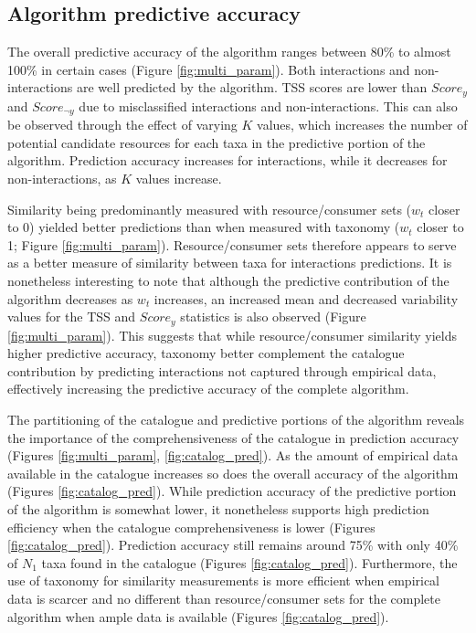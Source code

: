     \subsection{Algorithm predictive accuracy}
The overall predictive accuracy of the algorithm ranges between 80\% to almost 100\% in certain cases (Figure \ref{fig:multi_param}). Both interactions and non-interactions are well predicted by the algorithm. TSS scores are lower than $Score_y$ and $Score_{\neg y}$ due to misclassified interactions and non-interactions. This can also be observed through the effect of varying $K$ values, which increases the number of potential candidate resources for each taxa in the predictive portion of the algorithm. Prediction accuracy increases for interactions, while it decreases for non-interactions, as $K$ values increase.

Similarity being predominantly measured with resource/consumer sets ($w_t$ closer to 0) yielded better predictions than when measured with taxonomy ($w_t$ closer to 1; Figure \ref{fig:multi_param}). Resource/consumer sets therefore appears to serve as a better measure of similarity between taxa for interactions predictions. It is nonetheless interesting to note that although the predictive contribution of the algorithm decreases as $w_t$ increases, an increased mean and decreased variability values for the TSS and $Score_y$ statistics is also observed (Figure \ref{fig:multi_param}). This suggests that while resource/consumer similarity yields higher predictive accuracy, taxonomy better complement the catalogue contribution by predicting interactions not captured through empirical data, effectively increasing the predictive accuracy of the complete algorithm.

The partitioning of the catalogue and predictive portions of the algorithm reveals the importance of the comprehensiveness of the catalogue in prediction accuracy (Figures \ref{fig:multi_param}, \ref{fig:catalog_pred}). As the amount of empirical data available in the catalogue increases so does the overall accuracy of the algorithm (Figures \ref{fig:catalog_pred}). While prediction accuracy of the predictive portion of the algorithm is somewhat lower, it nonetheless supports high prediction efficiency when the catalogue comprehensiveness is lower (Figures \ref{fig:catalog_pred}). Prediction accuracy still remains around 75\% with only 40\% of $N_1$ taxa found in the catalogue (Figures \ref{fig:catalog_pred}). Furthermore, the use of taxonomy for similarity measurements is more efficient when empirical data is scarcer and no different than resource/consumer sets for the complete algorithm when ample data is available (Figures \ref{fig:catalog_pred}).

